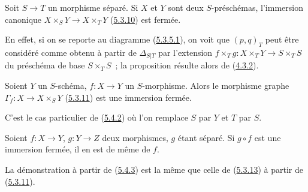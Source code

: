 \begin{proposition}[5.4.2]
\label{I.5.4.2-fr}
Soit $S\to T$ un morphisme séparé. Si $X$ et $Y$ sont deux $S$-préschémas,
l'immersion canonique $X\times_S Y\to X\times_T Y$
(\hyperref[I.5.3.10-fr]{5.3.10}) est fermée.
\end{proposition}

En effet, si on se reporte au diagramme
(\hyperref[I.5.3.5.1-fr]{5.3.5.1}), on voit que $(p,q)_T$ peut être considéré
comme obtenu à partir de $\Delta_{S|T}$ par l'extension
$f\times_T g:X\times_T Y\to S\times_T S$ du préschéma de base $S\times_T S$~;
la proposition résulte alors de (\hyperref[I.4.3.2-fr]{4.3.2}).

\begin{corollary}[5.4.3]
\label{I.5.4.3-fr}
Soient $Y$ un $S$-schéma, $f:X\to Y$ un $S$-morphisme. Alors le morphisme
graphe $\Gamma_f:X\to X\times_S Y$ (\hyperref[I.5.3.11-fr]{5.3.11}) est une
immersion fermée.
\end{corollary}

C'est le cas particulier de (\hyperref[I.5.4.2-fr]{5.4.2}) où l'on remplace
$S$ par $Y$ et $T$ par $S$.

\begin{corollary}[5.4.4]
\label{I.5.4.4-fr}
Soient $f:X\to Y$, $g:Y\to Z$ deux morphismes, $g$ étant séparé. Si $g\circ f$
est une immersion fermée, il en est de même de $f$.
\end{corollary}

La démonstration à partir de (\hyperref[I.5.4.3-fr]{5.4.3}) est la même que
celle de (\hyperref[I.5.3.13-fr]{5.3.13}) à partir de
(\hyperref[I.5.3.11-fr]{5.3.11}).

